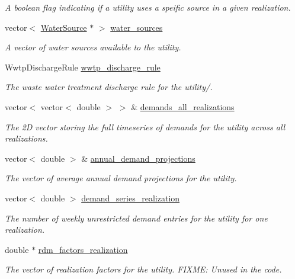 \begin{DoxyCompactItemize}
\begin{DoxyCompactList}\small\item\em A boolean flag indicating if a utility uses a speific source in a given realization. \end{DoxyCompactList}\item 
vector$<$ \mbox{\hyperlink{classWaterSource}{Water\+Source}} $\ast$ $>$ \mbox{\hyperlink{classUtility_a86ff2c92fc7f1b6bdca4bc84fdb535db}{water\+\_\+sources}}
\begin{DoxyCompactList}\small\item\em A vector of water sources available to the utility. \end{DoxyCompactList}\item 
Wwtp\+Discharge\+Rule \mbox{\hyperlink{classUtility_a0c598532230472e8106f6a71f97ea62d}{wwtp\+\_\+discharge\+\_\+rule}}
\begin{DoxyCompactList}\small\item\em The waste water treatment discharge rule for the utility/. \end{DoxyCompactList}\item 
vector$<$ vector$<$ double $>$ $>$ \& \mbox{\hyperlink{classUtility_a8ffed6cb590d6f0855128828c3f289b8}{demands\+\_\+all\+\_\+realizations}}
\begin{DoxyCompactList}\small\item\em The 2D vector storing the full timeseries of demands for the utility across all realizations. \end{DoxyCompactList}\item 
vector$<$ double $>$ \& \mbox{\hyperlink{classUtility_af260b06faba5238fe33687eff5ff1570}{annual\+\_\+demand\+\_\+projections}}
\begin{DoxyCompactList}\small\item\em The vector of average annual demand projections for the utility. \end{DoxyCompactList}\item 
vector$<$ double $>$ \mbox{\hyperlink{classUtility_a2f001332138af9aecd260ed1ad2348f4}{demand\+\_\+series\+\_\+realization}}
\begin{DoxyCompactList}\small\item\em The number of weekly unrestricted demand entries for the utility for one realization. \end{DoxyCompactList}\item 
double $\ast$ \mbox{\hyperlink{classUtility_a9888a401fb708200eb282799583762c9}{rdm\+\_\+factors\+\_\+realization}}
\begin{DoxyCompactList}\small\item\em The vector of realization factors for the utility. F\+I\+X\+ME\+: Unused in the code. \end{DoxyCompactList}\item 

\end{DoxyCompactItemize}
